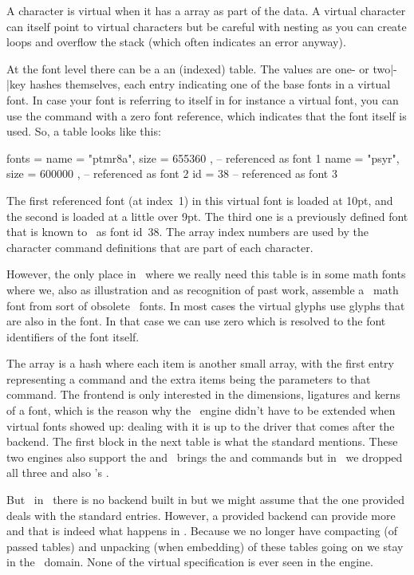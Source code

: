 {A character is virtual when it has a  array as part of the data.
A virtual character can itself point to virtual characters but be careful with
nesting as you can create loops and overflow the stack (which often indicates an
error anyway).

At the font level there can be a an (indexed)  table. The values are
one- or two|-|key hashes themselves, each entry indicating one of the base fonts
in a virtual font. In case your font is referring to itself in for instance a
virtual font, you can use the  command with a zero font reference,
which indicates that the font itself is used. So, a table looks like this:

\starttyping
fonts = {
  { name = "ptmr8a", size = 655360 }, -- referenced as font 1
  { name = "psyr", size = 600000 },   -- referenced as font 2
  { id = 38 }                         -- referenced as font 3
}
\stoptyping

The first referenced font (at index~1) in this virtual font is 
loaded at 10pt, and the second is  loaded at a little over 9pt. The
third one is a previously defined font that is known to \LUAMETATEX\ as font
id~38. The array index numbers are used by the character command definitions that
are part of each character.

However, the only place in \CONTEXT\ where we really need this 
table is in some math fonts where we, also as illustration and as recognition of
past work, assemble a \UNICODE\ math font from sort of obsolete \TYPEONE\ fonts.
In most cases the virtual glyphs use glyphs that are also in the font. In that
case we can use  zero which is resolved to the font identifiers of the
font itself.

The  array is a hash where each item is another small array, with
the first entry representing a command and the extra items being the parameters
to that command. The frontend is only interested in the dimensions, ligatures and
kerns of a font, which is the reason why the \TEX\ engine didn't have to be
extended when virtual fonts showed up: dealing with it is up to the driver that
comes after the backend. The first block in the next table is what the standard
mentions. These two engines also support the  and \LUATEX\ brings
the  and  commands but in \LUAMETATEX\ we dropped all
three and also \LUATEX's .

But \unknown\ in \LUAMETATEX\ there is no backend built in but we might assume
that the one provided deals with the standard entries. However, a provided
backend can provide more and that is indeed what happens in \CONTEXT. Because we
no longer have compacting (of passed tables) and unpacking (when embedding) of
these tables going on we stay in the \LUA\ domain. None of the virtual
specification is ever seen in the engine.

}

